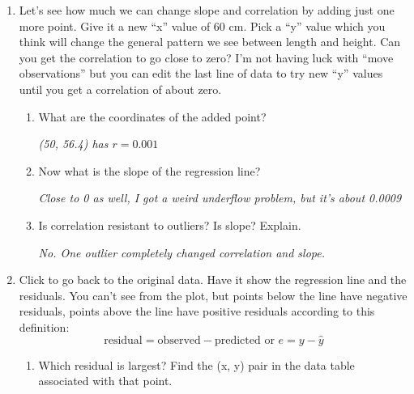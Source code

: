 \begin{enumerate}
\begin{enumerate}
  \item What height does this line give for a person whose foot length
    is 0?\vspace{.9cm}\\

    (This is an example of {\bf extrapolation}: predicting $y$ for an $x$ value
    outside the range of observed $x$'s.)
\end{enumerate}


\item  Let's see how much we can change slope and correlation by
  adding just one more point.  Give it a new ``x''  value of 60 cm.
  Pick a ``y'' value which you think will change the general pattern
  we see between length and height. Can you get the correlation to go
  close to zero?  I'm not having luck with ``move observations'' but
  you can edit the last line of data to try  new ``y'' values  until
  you get a correlation of about zero.  
  \begin{enumerate}
  \item 
  What are the coordinates of
  the added point?
\begin{students}
 \vspace{1cm}      
\end{students}

\begin{key}
  {\it (50, 56.4) has $r = 0.001$}
\end{key}
\item 
  Now what is the slope of the regression line? 
\begin{students}
 \vspace{1cm}      
\end{students}

\begin{key}
  {\it Close to 0 as well, I got a weird underflow problem, but it's
    about 0.0009}
\end{key}
\item Is correlation resistant to outliers?  Is slope? Explain.
  \begin{students}
 \vspace{1cm}      
\end{students}
\begin{key}
  {\it No.  One outlier completely changed correlation and slope.}
\end{key}
\end{enumerate}
\item Click  to go back to the original data. Have it
  show the regression line and the residuals.  You can't see from the
  plot, but points below the line have negative residuals, points
  above the line have positive residuals according to this definition:
$$ \mbox{residual} = \mbox{observed} - \mbox{predicted or } 
       e = y - \hat{y}$$
 \begin{enumerate}
   \item   Which residual is largest?
     Find the (x, y) pair  in the data table associated with that
     point.
\begin{students}
 \vspace{1cm}      
\end{students}


\end{enumerate}
\end{enumerate}
